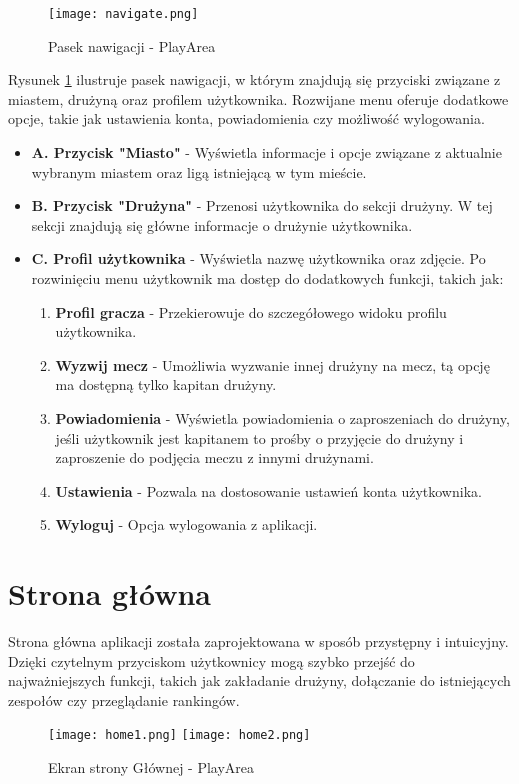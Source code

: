 \documentclass[wmii,inf,inz]{uwmthesis} %
\begin{document}
\begin{figure}[H]
    \centering
    \texttt{[image: navigate.png]}
    \caption{Pasek nawigacji - PlayArea}
    \label{fig:navigate}
\end{figure}
\noindent Rysunek \ref{fig:navigate} ilustruje pasek nawigacji, w którym znajdują się przyciski związane z miastem, drużyną oraz profilem użytkownika. Rozwijane menu oferuje dodatkowe opcje, takie jak ustawienia konta, powiadomienia czy możliwość wylogowania.
\newline
\begin{itemize}
    \item \textbf{A. Przycisk "Miasto"} - Wyświetla informacje i opcje związane z aktualnie wybranym miastem oraz ligą istniejącą w tym mieście.
    \item \textbf{B. Przycisk "Drużyna"} - Przenosi użytkownika do sekcji drużyny. W tej sekcji znajdują się główne informacje o drużynie użytkownika.
    \item \textbf{C. Profil użytkownika} - Wyświetla nazwę użytkownika oraz zdjęcie. Po rozwinięciu menu użytkownik ma dostęp do dodatkowych funkcji, takich jak:
        \begin{enumerate}[label=\Roman*., left=0.1cm]
            \item \textbf{Profil gracza} - Przekierowuje do szczegółowego widoku profilu użytkownika.
            \item \textbf{Wyzwij mecz} - Umożliwia wyzwanie innej drużyny na mecz, tą opcję ma dostępną tylko kapitan drużyny.
            \item \textbf{Powiadomienia} - Wyświetla powiadomienia o zaproszeniach do drużyny, jeśli użytkownik jest kapitanem to prośby o przyjęcie do drużyny i zaproszenie do podjęcia meczu z innymi drużynami.
            \item \textbf{Ustawienia} - Pozwala na dostosowanie ustawień konta użytkownika.
            \item \textbf{Wyloguj} - Opcja wylogowania z aplikacji.
        \end{enumerate}
\end{itemize}
\newpage
\section{Strona główna}
\noindent
Strona główna aplikacji została zaprojektowana w sposób przystępny i intuicyjny. Dzięki czytelnym przyciskom użytkownicy mogą szybko przejść do najważniejszych funkcji, takich jak zakładanie drużyny, dołączanie do istniejących zespołów czy przeglądanie rankingów.\newline
\begin{figure}[H]
    \centering
    \texttt{[image: home1.png]}
    \texttt{[image: home2.png]}
    \caption{Ekran strony Głównej - PlayArea}
    \label{fig:home}
\end{figure}
\noindent
\newline
\end{document}
